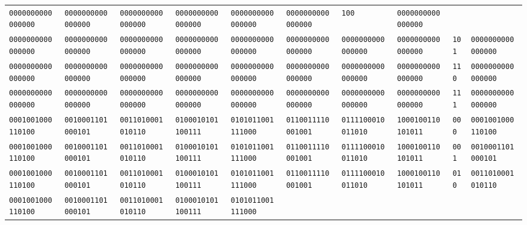 \documentclass[12pt]{article}
\begin{document}
\begin{table}[H]
{\begin{tabular}{@{}llllllllll@{}}
					\texttt{0000000000000000} &
					\texttt{0000000000000000} &
					\texttt{0000000000000000} &
					\texttt{0000000000000000} &
					\texttt{0000000000000000} &
					\texttt{0000000000000000} &
					\texttt{100} &
					\texttt{0000000000000000} \\
					\texttt{0000000000000000} &
					\texttt{0000000000000000} &
					\texttt{0000000000000000} &
					\texttt{0000000000000000} &
					\texttt{0000000000000000} &
					\texttt{0000000000000000} &
					\texttt{0000000000000000} &
					\texttt{0000000000000000} &
					\texttt{101} &
					\texttt{0000000000000000} \\
					\texttt{0000000000000000} &
					\texttt{0000000000000000} &
					\texttt{0000000000000000} &
					\texttt{0000000000000000} &
					\texttt{0000000000000000} &
					\texttt{0000000000000000} &
					\texttt{0000000000000000} &
					\texttt{0000000000000000} &
					\texttt{110} &
					\texttt{0000000000000000} \\
					\texttt{0000000000000000} &
					\texttt{0000000000000000} &
					\texttt{0000000000000000} &
					\texttt{0000000000000000} &
					\texttt{0000000000000000} &
					\texttt{0000000000000000} &
					\texttt{0000000000000000} &
					\texttt{0000000000000000} &
					\texttt{111} &
					\texttt{0000000000000000} \\
					\texttt{0001001000110100} &
					\texttt{0010001101000101} &
					\texttt{0011010001010110} &
					\texttt{0100010101100111} &
					\texttt{0101011001111000} &
					\texttt{0110011110001001} &
					\texttt{0111100010011010} &
					\texttt{1000100110101011} &
					\texttt{000} &
					\texttt{0001001000110100} \\
					\texttt{0001001000110100} &
					\texttt{0010001101000101} &
					\texttt{0011010001010110} &
					\texttt{0100010101100111} &
					\texttt{0101011001111000} &
					\texttt{0110011110001001} &
					\texttt{0111100010011010} &
					\texttt{1000100110101011} &
					\texttt{001} &
					\texttt{0010001101000101} \\
					\texttt{0001001000110100} &
					\texttt{0010001101000101} &
					\texttt{0011010001010110} &
					\texttt{0100010101100111} &
					\texttt{0101011001111000} &
					\texttt{0110011110001001} &
					\texttt{0111100010011010} &
					\texttt{1000100110101011} &
					\texttt{010} &
					\texttt{0011010001010110} \\
					\texttt{0001001000110100} &
					\texttt{0010001101000101} &
					\texttt{0011010001010110} &
					\texttt{0100010101100111} &
					\texttt{0101011001111000} &

\end{tabular}}
\end{table}
\end{document}

